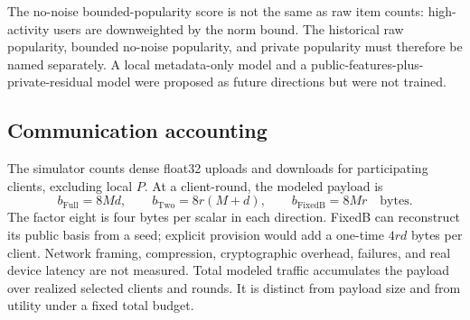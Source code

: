 The no-noise bounded-popularity score is not the same as raw item counts:
high-activity users are downweighted by the norm bound. The historical raw
popularity, bounded no-noise popularity, and private popularity must therefore
be named separately. A local metadata-only model and a public-features-plus-
private-residual model were proposed as future directions but were not trained.

\subsection{Communication accounting}
The simulator counts dense float32 uploads and downloads for participating
clients, excluding local $P$. At a client-round, the modeled payload is
\begin{equation}
 b_{\mathrm{Full}}=8Md,\qquad
 b_{\mathrm{Two}}=8r(M+d),\qquad
 b_{\mathrm{FixedB}}=8Mr\quad\text{bytes}.
 \label{eq:comm}
\end{equation}
The factor eight is four bytes per scalar in each direction. FixedB can
reconstruct its public basis from a seed; explicit provision would add a
one-time $4rd$ bytes per client. Network framing, compression, cryptographic
overhead, failures, and real device latency are not measured. Total modeled
traffic accumulates the payload over realized selected clients and rounds.
It is distinct from payload size and from utility under a fixed total budget.
